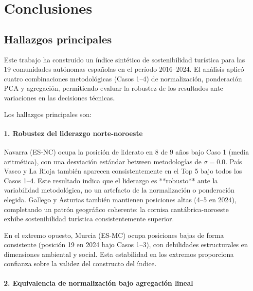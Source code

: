 
\chapter{Conclusiones}

\section{Hallazgos principales}

Este trabajo ha construido un índice sintético de sostenibilidad turística para las 19 comunidades autónomas españolas en el período 2016--2024. El análisis aplicó cuatro combinaciones metodológicas (Casos 1--4) de normalización, ponderación PCA y agregación, permitiendo evaluar la robustez de los resultados ante variaciones en las decisiones técnicas.

Los hallazgos principales son:

\subsubsection{1. Robustez del liderazgo norte-noroeste}

Navarra (ES-NC) ocupa la posición de liderato en 8 de 9 años bajo Caso 1 (media aritmética), con una desviación estándar between metodologías de $\sigma = 0.0$. País Vasco y La Rioja también aparecen consistentemente en el Top 5 bajo todos los Casos 1--4. Este resultado indica que el liderazgo es **robusto** ante la variabilidad metodológica, no un artefacto de la normalización o ponderación elegida. Gallego y Asturias también mantienen posiciones altas (4--5 en 2024), completando un patrón geográfico coherente: la cornisa cantábrica-noroeste exhibe sostenibilidad turística consistentemente superior.

En el extremo opuesto, Murcia (ES-MC) ocupa posiciones bajas de forma consistente (posición 19 en 2024 bajo Casos 1--3), con debilidades estructurales en dimensiones ambiental y social. Esta estabilidad en los extremos proporciona confianza sobre la validez del constructo del índice.

\subsubsection{2. Equivalencia de normalización bajo agregación lineal}

